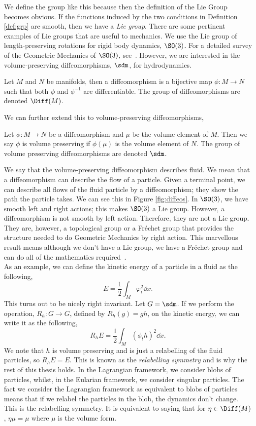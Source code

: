 \noindent
We define the group like this because then the definition of the Lie Group becomes obvious. If the functions induced by the two conditions in Definition \ref{def:grp} are smooth, then we have a \textit{Lie group}. There are some pertinent examples of Lie groups that are useful to mechanics. We use the Lie group of length-preserving rotations for rigid body dynamics, $\SO(3)$. For a detailed survey of the Geometric Mechanics of $\SO(3)$, see~\cite{arthur}. However, we are interested in the volume-preserving diffeomorphisms, $\sdm$, for hydrodynamics.
\begin{ndefi}[Diffeomorphism]
  Let $M$ and $N$ be manifolds, then a diffeomorphism is a bijective map $\phi: M \to N$ such that both $\phi$ and $\phi^{-1}$ are differentiable. The group of diffeomorphisms are denoted $\Diff(M)$.
\end{ndefi}
\noindent
We can further extend this to volume-preserving diffeomorphisms,
\begin{ndefi}
  Let $\phi : M \to N$ be a diffeomorphism and $\mu$ be the volume element of $M$. Then we say $\phi$ is volume preserving if $\phi(\mu)$ is the volume element of $N$. The group of volume preserving diffeomorphisms are denoted $\sdm$.
\end{ndefi}
\noindent
We say that the volume-preserving diffeomorphism describes fluid. We mean that a diffeomorphism can describe the flow of a particle. Given a terminal point, we can describe all flows of the fluid particle by a diffeomorphism; they show the path the particle takes. We can see this in Figure \ref{fig:diffeos}. In $\SO(3)$, we have smooth left and right actions; this makes $\SO(3)$ a Lie group. However, a diffeomorphism is not smooth by left action. Therefore, they are not a Lie group. They are, however, a topological group or a Fr\'echet group that provides the structure needed to do Geometric Mechanics by right action. This marvellous result means although we don't have a Lie group, we have a Fr\'echet group and can do all of the mathematics required~\cite{tatclg}. \\

\noindent
As an example, we can define the kinetic energy of a particle in a fluid as the following,
$$ E = \frac{1}{2}\int_M \varphi_t^2 \dd x. $$
This turns out to be nicely right invariant. Let $G = \sdm$. If we perform the operation, $R_h : G \to G$, defined by $R_h(g) = gh$, on the kinetic energy, we can write it as the following,
$$ R_hE = \frac{1}{2}\int_M (\phi_t h)^2 \dd x. $$
We note that $h$ is volume preserving and is just a relabelling of the fluid particles, so $R_hE = E$. This is known as the \textit{relabelling symmetry} and is why the rest of this thesis holds. In the Lagrangian framework, we consider blobs of particles, whilst, in the Eularian framework, we consider singular particles. The fact we consider the Lagrangian framework as equivalent to blobs of particles means that if we relabel the particles in the blob, the dynamics don't change. This is the relabelling symmetry. It is equivalent to saying that for $\eta \in \Diff(M)$, $\eta\mu = \mu$ where $\mu$ is the volume form.\\


